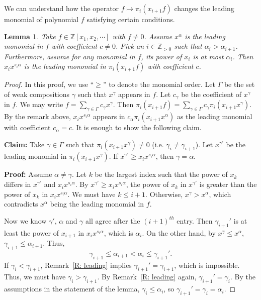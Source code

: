 \documentclass[10pt]{amsart}
\theoremstyle{plain}
\theoremstyle{plain}
\theoremstyle{definition}
\theoremstyle{definition}
\theoremstyle{definition}
\theoremstyle{plain}
\theoremstyle{plain}
\theoremstyle{plain}
\newtheorem{lemma}[lemma]{Lemma}
\theoremstyle{plain}
\theoremstyle{plain}
\theoremstyle{remark}
\theoremstyle{remark}
\theoremstyle{plain}
\theoremstyle{plain}
\newcommand{\Z}{\mathbb{Z}}
\begin{document}
We can understand how the operator
$f \mapsto \pi_i(x_{i+1} f)$ changes 
the leading monomial of polynomial $f$
satisfying certain conditions. 

\begin{lemma}
\label{L: monomials from operator}
Take $f \in \Z[x_1, x_2, \cdots ]$ with $f \neq 0$.
Assume $x^\alpha$ is the leading monomial in $f$ 
with coefficient $c \neq 0$.
Pick an $i\in \Z_{>0}$ such that $\alpha_{i} > \alpha_{i+1}$.
Furthermore, assume for any monomial in $f$, 
its power of $x_{i}$ is at most $\alpha_{i}$.
Then $x_ix^{s_i \alpha}$ is the leading monomial in
$\pi_{i}(x_{i+1}f)$ with coefficient $c$. 
\end{lemma}
\begin{proof}
In this proof, we use ``$\geq$'' to denote the 
monomial order.
Let $\Gamma$ be the set of weak compositions $\gamma$
such that $x^\gamma$ appears in $f$.
Let $c_\gamma$ be the coefficient of $x^\gamma$ in $f$.
We may write $f = \sum_{\gamma \in \Gamma} c_\gamma x^\gamma$.
Then 
$\pi_{i}(x_{i+1}f) = \sum_{\gamma \in \Gamma} c_\gamma \pi_{i}(x_{i+1}x^\gamma)$.
By the remark above, $x_ix^{s_i \alpha}$ appears 
in $c_\alpha\pi_i(x_{i+1}x^\alpha)$ as the leading monomial
with coefficient $c_\alpha = c$.
It is enough to show the following claim.

\noindent\textbf{Claim:} 
Take $\gamma \in \Gamma$ such that 
$\pi_i(x_{i+1}x^{\gamma}) \neq 0$ 
(i.e. $\gamma_i \neq \gamma_{i+1}$). 
Let $x^{\gamma'}$ be the leading monomial 
in $\pi_i(x_{i+1}x^{\gamma})$.
If $x^{\gamma'}  \geq x_ix^{s_i \alpha}$,
then $\gamma = \alpha$.

\noindent\textbf{Proof:} 
Assume $\alpha \neq \gamma$.
Let $k$ be the largest index such that 
the power of $x_k$ differs in $x^{\gamma'}$ and $x_ix^{s_i \alpha}$.
By $x^{\gamma'}  \geq x_ix^{s_i \alpha}$,
the power of $x_k$ in $x^{\gamma'}$ is greater than
the power of $x_k$ in $x_ix^{s_i \alpha}$.
We must have $k \leqslant i+1$.
Otherwise,
$x^\gamma > x^\alpha$,
which contradicts $x^\alpha$ being the leading monomial in $f$.

Now we know 
$\gamma'$, $\alpha$ and $\gamma$ all agree after 
the $(i+1)^{th}$ entry.
Then
$\gamma_{i+1}'$ is at least
the power of $x_{i+1}$ in $x_ix^{s_i \alpha}$,
which is $\alpha_i$.
On the other hand, by $x^\gamma \leqslant x^\alpha$,
$\gamma_{i+1} \leqslant \alpha_{i+1}$.
Thus, 
\begin{equation}
\label{EQ: chain inequality}
\gamma_{i+1} \leq  \alpha_{i+1}<\alpha_i \leq \gamma_{i+1}'.
\end{equation}
If $\gamma_{i} < \gamma_{i+1}$,
Remark~\ref{R: leading} implies $\gamma_{i+1}'= \gamma_{i+1}$,
which is impossible.
Thus, we must have $\gamma_i > \gamma_{i+1}$. 
By Remark~\ref{R: leading} again, $\gamma_{i+1}' = \gamma_i$.
By the assumptions in the statement of the lemma, $\gamma_i \leqslant \alpha_i$,
so $\gamma_{i+1}' = \gamma_i = \alpha_i$.


\end{proof}
\end{document}

